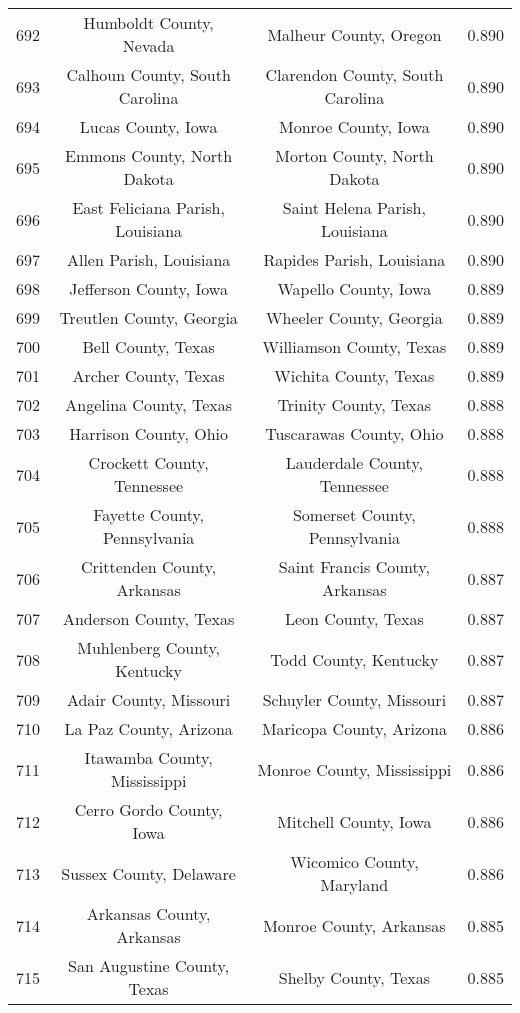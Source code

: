 \begin{longtable}{cccc}
  692 & Humboldt County, Nevada & Malheur County, Oregon & 0.890 \\ 
  693 & Calhoun County, South Carolina & Clarendon County, South Carolina & 0.890 \\ 
  694 & Lucas County, Iowa & Monroe County, Iowa & 0.890 \\ 
  695 & Emmons County, North Dakota & Morton County, North Dakota & 0.890 \\ 
  696 & East Feliciana Parish, Louisiana & Saint Helena Parish, Louisiana & 0.890 \\ 
  697 & Allen Parish, Louisiana & Rapides Parish, Louisiana & 0.890 \\ 
  698 & Jefferson County, Iowa & Wapello County, Iowa & 0.889 \\ 
  699 & Treutlen County, Georgia & Wheeler County, Georgia & 0.889 \\ 
  700 & Bell County, Texas & Williamson County, Texas & 0.889 \\ 
  701 & Archer County, Texas & Wichita County, Texas & 0.889 \\ 
  702 & Angelina County, Texas & Trinity County, Texas & 0.888 \\ 
  703 & Harrison County, Ohio & Tuscarawas County, Ohio & 0.888 \\ 
  704 & Crockett County, Tennessee & Lauderdale County, Tennessee & 0.888 \\ 
  705 & Fayette County, Pennsylvania & Somerset County, Pennsylvania & 0.888 \\ 
  706 & Crittenden County, Arkansas & Saint Francis County, Arkansas & 0.887 \\ 
  707 & Anderson County, Texas & Leon County, Texas & 0.887 \\ 
  708 & Muhlenberg County, Kentucky & Todd County, Kentucky & 0.887 \\ 
  709 & Adair County, Missouri & Schuyler County, Missouri & 0.887 \\ 
  710 & La Paz County, Arizona & Maricopa County, Arizona & 0.886 \\ 
  711 & Itawamba County, Mississippi & Monroe County, Mississippi & 0.886 \\ 
  712 & Cerro Gordo County, Iowa & Mitchell County, Iowa & 0.886 \\ 
  713 & Sussex County, Delaware & Wicomico County, Maryland & 0.886 \\ 
  714 & Arkansas County, Arkansas & Monroe County, Arkansas & 0.885 \\ 
  715 & San Augustine County, Texas & Shelby County, Texas & 0.885 \\ 

\end{longtable}
